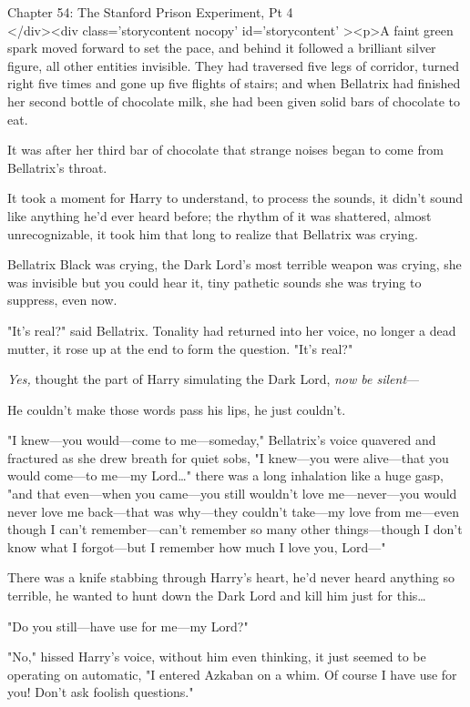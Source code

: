 
Chapter 54: The Stanford Prison Experiment, Pt 4\\
</div><div  class='storycontent nocopy' id='storycontent' ><p>A faint green 
spark moved forward to set the pace, and behind it followed a brilliant silver 
figure, all other entities invisible. They had traversed five legs of corridor, 
turned right five times and gone up five flights of stairs; and when Bellatrix 
had finished her second bottle of chocolate milk, she had been given solid bars 
of chocolate to eat.

It was after her third bar of chocolate that strange noises began to come from 
Bellatrix's throat.

It took a moment for Harry to understand, to process the sounds, it didn't 
sound like anything he'd ever heard before; the rhythm of it was shattered, 
almost unrecognizable, it took him that long to realize that Bellatrix was 
crying.

Bellatrix Black was crying, the Dark Lord's most terrible weapon was crying, 
she was invisible but you could hear it, tiny pathetic sounds she was trying to 
suppress, even now.

"It's real?" said Bellatrix. Tonality had returned into her voice, no longer a 
dead mutter, it rose up at the end to form the question. "It's real?"

\emph{Yes,} thought the part of Harry simulating the Dark Lord, \emph{now be 
silent}---

He couldn't make those words pass his lips, he just couldn't.

"I knew---you would---come to me---someday," Bellatrix's voice quavered and 
fractured as she drew breath for quiet sobs, "I knew---you were alive---that 
you would come---to me---my Lord{\ldots}" there was a long inhalation like a 
huge gasp, "and that even---when you came---you still wouldn't love 
me---never---you would never love me back---that was why---they couldn't 
take---my love from me---even though I can't remember---can't remember so many 
other things---though I don't know what I forgot---but I remember how much I 
love you, Lord---"

There was a knife stabbing through Harry's heart, he'd never heard anything so 
terrible, he wanted to hunt down the Dark Lord and kill him just for 
this{\ldots}

"Do you still---have use for me---my Lord?"

"No," hissed Harry's voice, without him even thinking, it just seemed to be 
operating on automatic, "I entered Azkaban on a whim. Of course I have use for 
you! Don't ask foolish questions."

